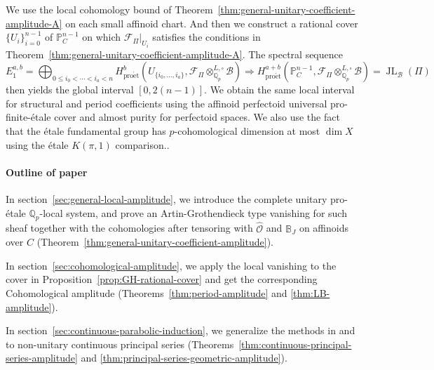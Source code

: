 \documentclass[11pt]{article}
\theoremstyle{definition}
\newcommand{\cF}{\mathcal F}
\newcommand{\proet}{\mathrm{pro\acute et}}
\newcommand{\JL}{\operatorname{JL}}
\begin{document}
We use the local cohomology bound of Theorem~\ref{thm:general-unitary-coefficient-amplitude-A}
on each small affinoid chart. %
And then we construct a rational cover \(\{U_i\}_{i=0}^{n-1}\) of $\mathbb{P}^{n-1}_C$ on which $\cF_\Pi|_{U_i}$ satisfies the conditions in Theorem~\ref{thm:general-unitary-coefficient-amplitude-A}.
The spectral sequence
\[
 E_1^{a,b}=\bigoplus_{0\leq i_0<\cdots<i_a<n}
 H^b_{\proet}(U_{\{i_0,\ldots,i_a\}},\cF_\Pi\otimes_{\mathbb{Q}_p}^{L, \square}\mathscr{B})
 \Longrightarrow H^{a+b}_{\proet}(\mathbb P_C^{n-1},\cF_\Pi\otimes_{\mathbb{Q}_p}^{L, \square}\mathscr{B})=\JL_{\mathscr{B}}(\Pi)
\]
then yields the global interval \([0,2(n-1)]\).
We obtain the same local interval for structural and period
coefficients using the affinoid perfectoid universal pro-finite-\'etale cover
and almost purity for perfectoid spaces. We also use the fact that the
\'etale fundamental group has \(p\)-cohomological dimension at most \(\dim X\) using the \'etale $K(\pi, 1)$ comparison..

\paragraph{Outline of paper}In section~\ref{sec:general-local-amplitude}, we introduce the complete unitary pro-\'etale $\mathbb{Q}_p$-local system, and prove an Artin-Grothendieck type vanishing for such sheaf
together with the cohomologies after tensoring with $\widehat{\mathscr{O}}$ and $\mathbb{B}_J$ on affinoids over $C$ (Theorem~\ref{thm:general-unitary-coefficient-amplitude}). 

In section~\ref{sec:cohomological-amplitude}, we apply the local vanishing to the cover in Proposition~\ref{prop:GH-rational-cover} and get the corresponding Cohomological amplitude (Theorems~\ref{thm:period-amplitude} and \ref{thm:LB-amplitude}).

In section~\ref{sec:continuous-parabolic-induction}, we generalize the methods in \cite{Ludwig} and \cite{JLH} to non-unitary continuous principal series (Theorems~\ref{thm:continuous-principal-series-amplitude} and \ref{thm:principal-series-geometric-amplitude}).
\end{document}
